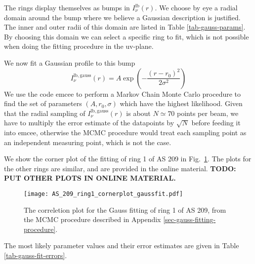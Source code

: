 \documentclass{aa}
\begin{document}
The rings display themselves as bumps in $I_\nu^{\mathrm{lb}}(r)$. We choose by eye
a radial domain around the bump where we believe a Gaussian description is justified.
The inner and outer radii of this domain are listed in Table \ref{tab-gauss-params}.
By choosing this domain we can select a specific ring to fit, which is not possible
when doing the fitting procedure in the uv-plane.

We now fit a Gaussian profile to this bump
\begin{equation}
I_\nu^{\mathrm{lb,gauss}}(r) = A\exp\left(-\frac{(r-r_0)^2}{2\sigma^2}\right)
\end{equation}
We use the code {\small\sf emcee} \citep{2013PASP..125..306F} to perform a
Markov Chain Monte Carlo procedure to find the set of parameters
$(A,r_0,\sigma)$ which have the highest likelihood. Given that the radial
sampling of $I_\nu^{\mathrm{lb,gauss}}(r)$ is about $N\simeq 70$ points per beam, we
have to multiply the error estimate of the datapoints by $\sqrt{N}$ before
feeding it into {\small\sf emcee}, otherwise the MCMC procedure would treat each
sampling point as an independent measuring point, which is not the case.

We show the corner plot of the fitting of ring 1 of AS 209 in
Fig.~\ref{fig-corner-gaussfit-as209-1}. The plots for the other rings are
similar, and are provided in the online material. {\bf TODO: PUT OTHER PLOTS
IN ONLINE MATERIAL.}

\begin{figure}
\centerline{\texttt{[image: AS\_209\_ring1\_cornerplot\_gaussfit.pdf]}}
\caption{\label{fig-corner-gaussfit-as209-1}The correletion plot for the Gauss
  fitting of ring 1 of AS 209, from the MCMC procedure described in Appendix
  \ref{sec-gauss-fitting-procedure}.}
\end{figure}

The most likely parameter values and their error estimates are given in
Table \ref{tab-gauss-fit-errors}.
\end{document}
